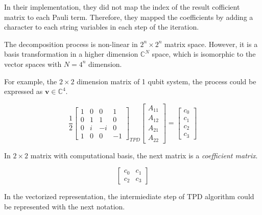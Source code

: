 \documentclass[twocolumn]{article}
\begin{document}
In their implementation, they did not map the index of the result cofficient matrix to 
each Pauli term. Therefore, they mapped the coefficients by adding a character to each string variables 
in each step of the iteration. 

The decomposition process is non-linear in $2^n \times 2^n$ matrix space. 
However, it is a basis transformation in a higher dimension $\mathbb{C}^N$ space, 
which is isomorphic to the vector spaces with $N = 4^n$ dimension.

For example, the $2 \times 2$ dimension matrix of 1 qubit system, the process could be expressed as 
$\mathbf{v} \in \mathbb{C}^4$. 

\begin{equation}
    \frac{1}{2}
    \begin{bmatrix}
        1 & 0 &  0 &  1\\
        0 & 1 &  1 &  0\\ 
        0 & i & -i &  0\\ 
        1 & 0 &  0 & -1 
    \end{bmatrix}_{TPD}
    \begin{bmatrix}
        A_{11} \\
        A_{12} \\
        A_{21} \\
        A_{22}
    \end{bmatrix} =
    \begin{bmatrix}
        c_0\\
        c_1\\
        c_2\\
        c_3
    \end{bmatrix}
\end{equation}

In $2 \times 2$ matrix with computational basis, the next matrix is a \textit{coefficient matrix}.

\begin{equation}
    \begin{bmatrix}
        c_0 & c_1\\
        c_2 & c_3
    \end{bmatrix}
\end{equation}

In the vectorized representation, the intermiediate step of TPD algorithm 
could be represented with the next notation. 
\end{document}
